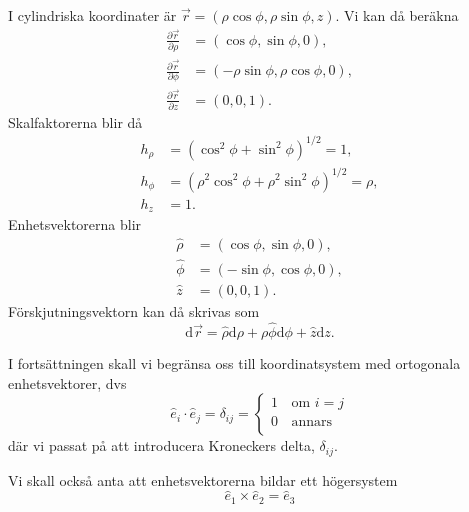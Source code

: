 \documentclass[%
oneside,                 %
final,                   %
10pt]{article}
\newenvironment{notice_mdfboxadmon}[1][]{
\begin{notice_mdfboxmdframed}[frametitle=#1]
}
{
\end{notice_mdfboxmdframed}
}
\begin{document}
\begin{notice_mdfboxadmon}
I cylindriska koordinater är $\vec{r} = (\rho\cos \phi, \rho\sin \phi, z)$.  Vi kan då beräkna
\begin{align}
  \frac{\partial \vec{r}}{\partial \rho} &= \left(\cos \phi, \sin \phi, 0\right), \\ 
  \frac{\partial \vec{r}}{\partial \phi} &= \left(-\rho \sin\phi, \rho \cos \phi,
0\right), \\ 
  \frac{\partial \vec{r}}{\partial z} &= \left(0,0,1\right).
\end{align}
Skalfaktorerna blir då
\begin{align}
  h_\rho &= \left(\cos^2\phi + \sin^2\phi\right)^{1/2} = 1, \\ 
  h_\phi &= \left(\rho^2 \cos^2\phi + \rho^2 \sin^2\phi\right)^{1/2} = \rho, \\ 
  h_z &= 1.
\end{align}
Enhetsvektorerna blir
\begin{align}
  \hat{\rho} &= \left(\cos\phi, \sin\phi,0\right), \\ 
  \hat{\phi} &= \left(-\sin\phi, \cos\phi,0\right), \\ 
  \hat{z} &= \left(0,0,1\right).
\end{align}
Förskjutningsvektorn kan då skrivas som
\begin{equation}
  \mbox{d}\vec{r} = \hat{\rho} \mbox{d}\rho + \rho \hat{\phi} \mbox{d} \phi + \hat{z} \mbox{d}z.
\end{equation}
\end{notice_mdfboxadmon} %



I fortsättningen skall vi begränsa oss till koordinatsystem med ortogonala enhetsvektorer, dvs
\begin{equation}
\hat{e}_i \cdot \hat{e}_j = \delta_{ij} = \left\{
\begin{array}{ll}
1 & \,\mbox{om}\,\, i = j \\ 
0 & \,\mbox{annars}\\ 
\end{array}\right.
\end{equation}
där vi passat på att introducera Kroneckers delta, $\delta_{ij}$.

Vi skall också anta att enhetsvektorerna bildar ett högersystem
\begin{equation}
\hat{e}_1 \times \hat{e}_2 = \hat{e}_3
\end{equation}
\end{document}
